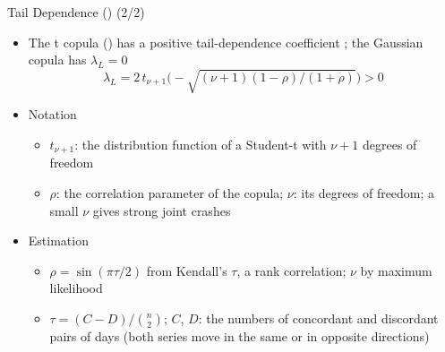 \begin{frame}{Tail Dependence () (2/2)}
\itemsize{\small}
\begin{itemize}
    \item The t copula () has a positive tail-dependence coefficient ; the Gaussian copula has $\lambda_L = 0$ \[ \lambda_L = 2\,t_{\nu+1}\Big(-\sqrt{(\nu + 1)(1 - \rho)/(1 + \rho)}\Big) > 0 \]
    \item Notation
    \begin{itemize}
        \item $t_{\nu+1}$: the distribution function of a Student-t with $\nu + 1$ degrees of freedom
        \item $\rho$: the correlation parameter of the copula; $\nu$: its degrees of freedom; a small $\nu$ gives strong joint crashes
    \end{itemize}
    \item Estimation
    \begin{itemize}
        \item $\rho = \sin(\pi\tau/2)$ from Kendall's $\tau$, a rank correlation; $\nu$ by maximum likelihood
        \item $\tau = (C - D)/\binom{n}{2}$; $C$, $D$: the numbers of concordant and discordant pairs of days (both series move in the same or in opposite directions)
    \end{itemize}
\end{itemize}
\end{frame}


